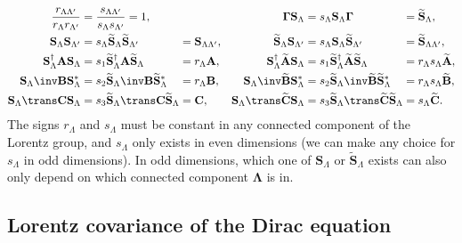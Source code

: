 \documentclass[11pt]{article}
\newcommand{\Gammab}{\boldsymbol{\Gamma}}
\renewcommand{\S}{\mathbf{S}}
\newcommand{\A}{\mathbf{A}}
\newcommand{\B}{\mathbf{B}}
\renewcommand{\C}{\mathbf{C}}
\newcommand{\At}{\widetilde{\A}}
\newcommand{\Bt}{\widetilde{\B}}
\newcommand{\Ct}{\widetilde{\C}}
\newcommand{\St}{\widetilde{\S}}
\newcommand{\Lambdab}{\boldsymbol{\Lambda}}
\begin{document}
\begin{equation}\label{eq:constnormlorentz}
\begin{alignedat}{4}
  \frac{r_{\Lambda\Lambda'}}{r_{\Lambda} r_{\Lambda'}}
    &= \frac{s_{\Lambda\Lambda'}}{s_{\Lambda} s_{\Lambda'}} 
    = 1, &&&
  \Gammab \S_\Lambda 
    &= s_\Lambda \S_\Lambda \Gammab &
    &= \St_\Lambda, \\
  \S_\Lambda \S_{\Lambda'} 
    &= s_{\Lambda} \St_\Lambda \St_{\Lambda'} &
    &= \S_{\Lambda\Lambda'}, &
  \St_\Lambda \S_{\Lambda'}
    &= s_{\Lambda} \S_\Lambda \St_{\Lambda'} &
    &= \St_{\Lambda\Lambda'}, \\ 
  \S_\Lambda^\dag \A \S_\Lambda 
    &= s_1 \St_\Lambda^\dag \A \St_\Lambda &
    &= r_\Lambda \A, &
  \S_\Lambda^\dag \At \S_\Lambda 
    &= s_1 \St_\Lambda^\dag \At \St_\Lambda &
    &= r_\Lambda s_\Lambda \At, \\
  \S_\Lambda\inv \B \S_\Lambda^\ast 
    &= s_2 \St_\Lambda\inv \B \St_\Lambda^\ast &
    &= r_\Lambda \B, &\qquad
  \S_\Lambda\inv \Bt \S_\Lambda^\ast 
    &= s_2 \St_\Lambda\inv \Bt \St_\Lambda^\ast &
    &= r_\Lambda s_\Lambda \Bt, \\ 
  \S_\Lambda\trans \C \S_\Lambda 
    &= s_3 \St_\Lambda\trans \C \St_\Lambda &
    &= \C, & 
  \S_\Lambda\trans \Ct \S_\Lambda 
    &= s_3 \St_\Lambda\trans \Ct \St_\Lambda &
    &= s_\Lambda \Ct. 
\end{alignedat}
\end{equation}
%
The signs \(r_\Lambda\) and \(s_\Lambda\) must be constant in any connected component of the Lorentz group,
and \(s_\Lambda\) only exists in even dimensions 
(we can make any choice for \(s_\Lambda\)  in odd dimensions).
In odd dimensions, which one of \(\S_\Lambda\) or \(\St_\Lambda\) exists can also only depend on which connected component \(\Lambdab\) is in.
  

\subsection{Lorentz covariance of the Dirac equation}\label{sec:diraclorentz}
\end{document}
